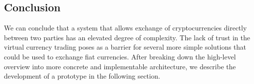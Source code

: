 \subsection{Conclusion}

We can conclude that a system that allows exchange of cryptocurrencies directly between two parties has an elevated degree of complexity. The lack of trust in the virtual currency trading poses as a barrier for several more simple solutions that could be used to exchange fiat currencies. After breaking down the high-level overview into more concrete and implementable architecture, we describe the development of a prototype in the following section.
